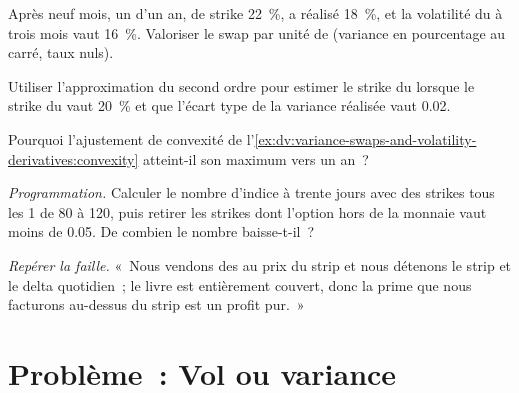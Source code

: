 \begin{exercise}[$\star\star$]\label{exo:dv:variance-swaps-and-volatility-derivatives:4}
Après neuf mois, un  d'un an, de strike 22~\%, a réalisé 18~\%, et la volatilité du  à trois mois vaut 16~\%. Valoriser
le swap par unité de  (variance en pourcentage au carré, taux nuls).
\end{exercise}

\begin{exercise}[$\star\star$]\label{exo:dv:variance-swaps-and-volatility-derivatives:5}
Utiliser l'approximation du second ordre pour estimer le strike du  lorsque le strike du  vaut 20~\%
et que l'écart type de la variance réalisée vaut 0.02.
\end{exercise}

\begin{exercise}[$\star\star$]\label{exo:dv:variance-swaps-and-volatility-derivatives:6}
Pourquoi l'ajustement de convexité de l'\cref{ex:dv:variance-swaps-and-volatility-derivatives:convexity} atteint-il son maximum vers
un an~?
\end{exercise}

\begin{exercise}[$\star\star\star$]\label{exo:dv:variance-swaps-and-volatility-derivatives:7}
\emph{Programmation.} Calculer le nombre d'indice à trente jours avec des strikes tous les 1 de 80 à 120, puis retirer les
strikes dont l'option hors de la monnaie vaut moins de 0.05. De combien le nombre baisse-t-il~?
\end{exercise}

\begin{exercise}[$\star\star\star$]\label{exo:dv:variance-swaps-and-volatility-derivatives:8}
\emph{Repérer la faille.} «~Nous vendons des  au prix du strip et nous détenons le strip et le delta quotidien~; le
livre est entièrement couvert, donc la prime que nous facturons au-dessus du strip est un profit pur.~»
\end{exercise}

\section{Problème~: Vol ou variance}

